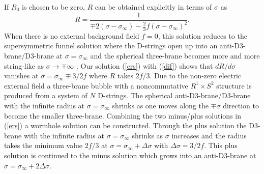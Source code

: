 \documentclass[12pt,a4paper]{article}
\begin{document}
If $R_0$ is chosen to be zero, $R$ can be obtained explicitly in
terms of $\sigma$ as
\begin{equation}
R = \frac{1}{\mp2(\sigma - \sigma_{\infty}) - \frac{2}{3}
f(\sigma - \sigma_{\infty})^2}.
\label{ers}\end{equation}
When there is no external background field $f=0$, 
this solution reduces to the
supersymmetric funnel solution where the D-strings open up into an
anti-D3-brane/D3-brane at $\sigma = \sigma_{\infty}$ and the spherical
three-brane becomes more and more string-like as $\sigma \rightarrow
\mp \infty$ \cite{CMT}. Our solution (\ref{ers}) with (\ref{dif})
shows that $dR/d\sigma$ vanishes at $\sigma = \sigma_{\infty} \mp
3/2f$ where $R$ takes $2f/3$. Due to the non-zero electric external field
a three-brane bubble with a noncommutative $R^1 \times S^2$ structure is
produced from a system of $N$ D-strings. The spherical 
anti-D3-brane/D3-brane with the infinite radius at $\sigma = 
\sigma_{\infty}$ shrinks as one moves along the $\mp \sigma$ direction
to become the smaller three-brane. Combining the two minus/plus solutions
in (\ref{ers}) a wormhole solution can be constructed. Through the plus
solution the D3-brane with the infinite radius at $\sigma = 
\sigma_{\infty}$ shrinks as $\sigma$ increases and the radius takes the
minimum value $2f/3$ at $\sigma = \sigma_{\infty} + \Delta\sigma$ with
$\Delta\sigma = 3/2f$. This plus solution is continued to the minus
solution which grows into an anti-D3-brane at $\sigma = \sigma_{\infty}
+2\Delta\sigma$.
\end{document}
